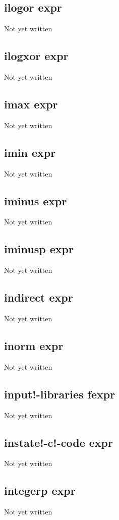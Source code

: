 \documentclass[a4paper,11pt]{article}
\begin{document}
\subsection{\ttfamily ilogor expr}
Not yet written

\subsection{\ttfamily ilogxor expr}
Not yet written

\subsection{\ttfamily imax expr}
Not yet written

\subsection{\ttfamily imin expr}
Not yet written

\subsection{\ttfamily iminus expr}
Not yet written

\subsection{\ttfamily iminusp expr}
Not yet written

\subsection{\ttfamily indirect expr}
Not yet written

\subsection{\ttfamily inorm expr}
Not yet written

\subsection{\ttfamily input!-libraries fexpr}
Not yet written

\subsection{\ttfamily instate!-c!-code expr}
Not yet written

\subsection{\ttfamily integerp expr}
Not yet written
\end{document}
